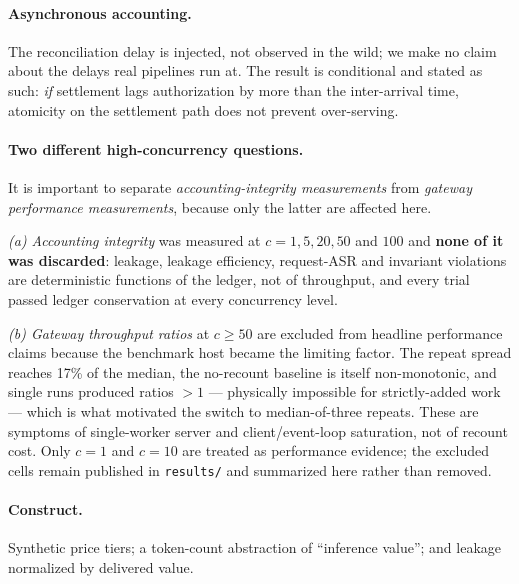 \documentclass[11pt]{article}
\begin{document}
\paragraph{Asynchronous accounting.} The reconciliation delay is injected, not observed in
the wild; we make no claim about the delays real pipelines run at. The result is
conditional and stated as such: \emph{if} settlement lags authorization by more than the
inter-arrival time, atomicity on the settlement path does not prevent over-serving.

\paragraph{Two different high-concurrency questions.} It is important to separate
\emph{accounting-integrity measurements} from \emph{gateway performance measurements},
because only the latter are affected here.

\emph{(a) Accounting integrity} was measured at $c=1,5,20,50$ and $100$ and \textbf{none
of it was discarded}: leakage, leakage efficiency, request-ASR and invariant violations
are deterministic functions of the ledger, not of throughput, and every trial passed
ledger conservation at every concurrency level.

\emph{(b) Gateway throughput ratios} at $c\ge50$ are excluded from headline performance
claims because the benchmark host became the limiting factor. The repeat spread reaches
17\% of the median, the no-recount baseline is itself non-monotonic, and single runs
produced ratios $>1$ --- physically impossible for strictly-added work --- which is what
motivated the switch to median-of-three repeats. These are symptoms of single-worker
server and client/event-loop saturation, not of recount cost. Only $c=1$ and $c=10$ are
treated as performance evidence; the excluded cells remain published in
\texttt{results/} and summarized here rather than removed.

\paragraph{Construct.} Synthetic price tiers; a token-count abstraction of ``inference
value''; and leakage normalized by delivered value.
\end{document}
